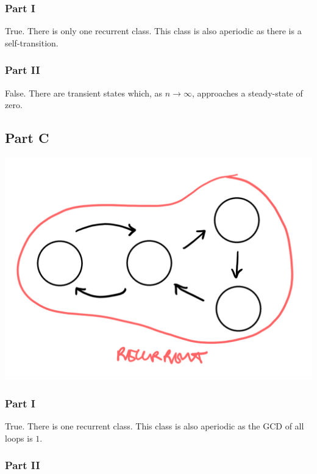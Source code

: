 \documentclass{article}
\begin{document}
\subsubsection*{Part I}

True. There is only one recurrent class. This class is also aperiodic as
there is a self-transition.

\subsubsection*{Part II}

False. There are transient states which, as $n \longrightarrow \infty$,
approaches a steady-state of zero.

\subsection*{Part C}

\begin{center}
    \includegraphics[scale=0.25]{Images/P1C.PNG}
\end{center}

\subsubsection*{Part I}

True. There is one recurrent class. This class is also aperiodic as the GCD
of all loops is $1$.

\subsubsection*{Part II}
\end{document}
